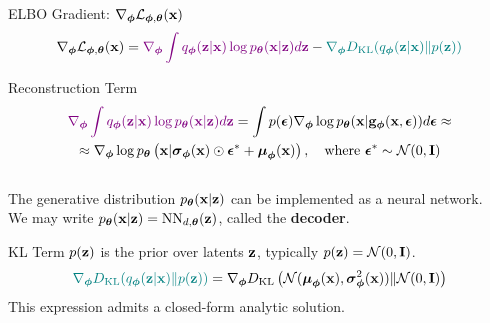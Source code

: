 \documentclass{beamer}
\begin{document}
\begin{frame}{ELBO Gradient: $\nabla_{\bphi} \cL_{\bphi, \btheta}(\bx)$}
	\vspace{-0.3cm}
	\[
		\nabla_{\bphi} \cL_{\bphi, \btheta}(\bx) = {\color{violet}\nabla_{\bphi} \int q_{\bphi}(\bz| \bx)\log \pt(\bx | \bz) d \bz} - {\color{teal}\nabla_{\bphi} \KL(q_{\bphi}(\bz| \bx) \| p(\bz))}
	\]
	\eqpause
	\vspace{-0.3cm}
	\begin{block}{Reconstruction Term}
		\vspace{-0.7cm}
		\begin{multline*}
			 {\color{violet}\nabla_{\bphi} \int q_{\bphi}(\bz| \bx)\log \pt(\bx | \bz) d \bz} = \int p(\bepsilon) \nabla_{\bphi} \log \pt(\bx | \bg_{\bphi}(\bx, \bepsilon)) d\bepsilon \approx \\
			 \approx \nabla_{\bphi} \log \pt\left(\bx | \bsigma_{\bphi}(\bx) \odot \bepsilon^* + \bmu_{\bphi}(\bx)\right), \quad \text{where } \bepsilon^* \sim \cN(0, \bI)
		\end{multline*}
		\eqpause
		\vspace{-0.5cm} \\
		The generative distribution $\pt(\bx | \bz)$ can be implemented as a neural network. \\
		We may write $\pt(\bx | \bz) = \NN_{d, \btheta}(\bz)$, called the \textbf{decoder}.
	\end{block}
	\eqpause
	\begin{block}{KL Term}
		$p(\bz)$ is the prior over latents $\bz$, typically $p(\bz) = \cN (0, \bI)$.
		\[
			{\color{teal}\nabla_{\bphi} \KL(q_{\bphi}(\bz| \bx) \| p(\bz))} = \nabla_{\bphi} \KL\left( \cN (\bmu_{\bphi}(\bx), \bsigma^2_{\bphi}(\bx)) \| \cN (0, \bI) \right)
		\]
		\eqpause
		This expression admits a closed-form analytic solution.
	\end{block}
\end{frame}
\end{document}
